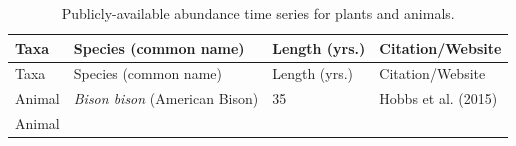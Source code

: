\documentclass[12pt,]{article}
\begin{document}
\footnotesize

\begin{longtable}[]{@{}llll@{}}
\caption{Publicly-available abundance time series for plants and
animals.}\tabularnewline
\toprule
\begin{minipage}[b]{0.06\columnwidth}\raggedright\strut
Taxa\strut
\end{minipage} & \begin{minipage}[b]{0.32\columnwidth}\raggedright\strut
Species (common name)\strut
\end{minipage} & \begin{minipage}[b]{0.22\columnwidth}\raggedright\strut
Length (yrs.)\strut
\end{minipage} & \begin{minipage}[b]{0.28\columnwidth}\raggedright\strut
Citation/Website\strut
\end{minipage}\tabularnewline
\midrule
\endfirsthead
\toprule
\begin{minipage}[b]{0.06\columnwidth}\raggedright\strut
Taxa\strut
\end{minipage} & \begin{minipage}[b]{0.32\columnwidth}\raggedright\strut
Species (common name)\strut
\end{minipage} & \begin{minipage}[b]{0.22\columnwidth}\raggedright\strut
Length (yrs.)\strut
\end{minipage} & \begin{minipage}[b]{0.28\columnwidth}\raggedright\strut
Citation/Website\strut
\end{minipage}\tabularnewline
\midrule
\endhead
\begin{minipage}[t]{0.06\columnwidth}\raggedright\strut
Animal\strut
\end{minipage} & \begin{minipage}[t]{0.32\columnwidth}\raggedright\strut
\emph{Bison bison} (American Bison)\strut
\end{minipage} & \begin{minipage}[t]{0.22\columnwidth}\raggedright\strut
35\strut
\end{minipage} & \begin{minipage}[t]{0.28\columnwidth}\raggedright\strut
Hobbs et al. (2015)\strut
\end{minipage}\tabularnewline
\begin{minipage}[t]{0.06\columnwidth}\raggedright\strut
Animal\strut
\end{minipage} & \begin{minipage}[t]{0.32\columnwidth}\raggedright\strut

\end{minipage}
\end{longtable}
\end{document}
